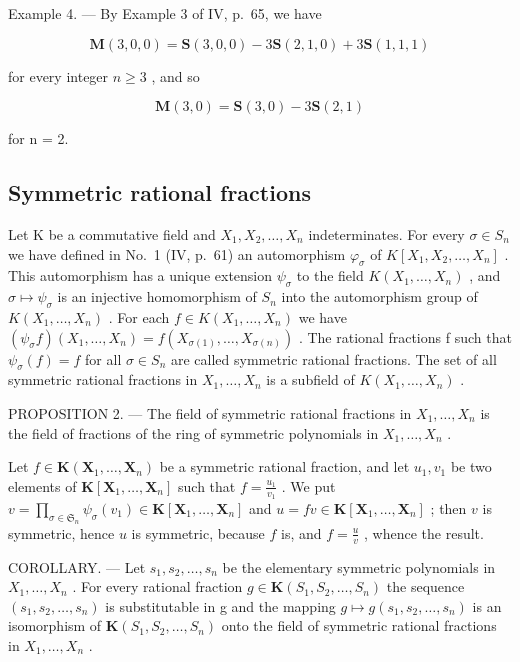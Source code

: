 Example 4. --- By Example 3 of IV, p.~65, we have

\[
\mathbf {M} (3, 0, 0) = \mathbf {S} (3, 0, 0) - 3 \mathbf {S} (2, 1, 0) + 3 \mathbf {S} (1, 1, 1)
\]

for every integer \(n \geqslant 3\) , and so

\[
\mathbf {M} (3, 0) = \mathbf {S} (3, 0) - 3 \mathbf {S} (2, 1)
\]

for n = 2.

\subsection{Symmetric rational fractions}

Let K be a commutative field and \(X_{1}, X_{2}, \ldots, X_{n}\) indeterminates. For every \(\sigma \in S_{n}\) we have defined in No.~1 (IV, p.~61) an automorphism \(\varphi_{\sigma}\) of \(K[X_{1}, X_{2}, \ldots, X_{n}]\) . This automorphism has a unique extension \(\psi_{\sigma}\) to the field \(K(X_{1}, \ldots, X_{n})\) , and \(\sigma \mapsto \psi_{\sigma}\) is an injective homomorphism of \(S_{n}\) into the automorphism group of \(K(X_{1}, \ldots, X_{n})\) . For each \(f \in K(X_{1}, \ldots, X_{n})\) we have \((\psi_{\sigma} f) (X_{1}, \ldots, X_{n}) = f(X_{\sigma(1)}, \ldots, X_{\sigma(n)})\) . The rational fractions f such that \(\psi_{\sigma}(f) = f\) for all \(\sigma \in S_{n}\) are called symmetric rational fractions. The set of all symmetric rational fractions in \(X_{1}, \ldots, X_{n}\) is a subfield of \(K(X_{1}, \ldots, X_{n})\) .

PROPOSITION 2. --- The field of symmetric rational fractions in \(X_{1}, \ldots, X_{n}\) is the field of fractions of the ring of symmetric polynomials in \(X_{1}, \ldots, X_{n}\) .

Let \(f \in \mathbf{K}(\mathbf{X}_1, \ldots, \mathbf{X}_n)\) be a symmetric rational fraction, and let \(u_1, v_1\) be two elements of \(\mathbf{K}[\mathbf{X}_1, \ldots, \mathbf{X}_n]\) such that \(f = \frac{u_1}{v_1}\) . We put \(v = \prod_{\sigma \in \mathfrak{S}_n} \psi_\sigma(v_1) \in \mathbf{K}[\mathbf{X}_1, \ldots, \mathbf{X}_n]\) and \(u = fv \in \mathbf{K}[\mathbf{X}_1, \ldots, \mathbf{X}_n]\) ; then \(v\) is symmetric, hence \(u\) is symmetric, because \(f\) is, and \(f = \frac{u}{v}\) , whence the result.

COROLLARY. --- Let \(s_{1}, s_{2}, \ldots, s_{n}\) be the elementary symmetric polynomials in \(X_{1}, \ldots, X_{n}\) . For every rational fraction \(g \in \mathbf{K}(S_{1}, S_{2}, \ldots, S_{n})\) the sequence \((s_{1}, s_{2}, \ldots, s_{n})\) is substitutable in g and the mapping \(g \mapsto g(s_{1}, s_{2}, \ldots, s_{n})\) is an isomorphism of \(\mathbf{K}(S_{1}, S_{2}, \ldots, S_{n})\) onto the field of symmetric rational fractions in \(X_{1}, \ldots, X_{n}\) .

